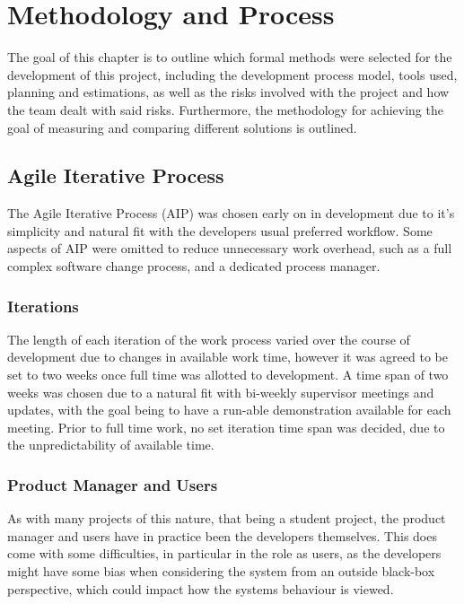 \chapter{Methodology and Process}

The goal of this chapter is to outline which formal methods were selected for the development of this project, including the development process model, tools used, planning and estimations, as well as the risks involved with the project and how the team dealt with said risks. Furthermore, the methodology for achieving the goal of measuring and comparing different solutions is outlined.

\section{Agile Iterative Process}

The Agile Iterative Process\cite{raj13} (AIP) was chosen early on in development due to it's simplicity and natural fit with the developers usual preferred workflow. Some aspects of AIP were omitted to reduce unnecessary work overhead, such as a full complex software change process, and a dedicated process manager.

\subsection{Iterations}

The length of each iteration of the work process varied over the course of development due to changes in available work time, however it was agreed to be set to two weeks once full time was allotted to development. A time span of two weeks was chosen due to a natural fit with bi-weekly supervisor meetings and updates, with the goal being to have a run-able demonstration available for each meeting. Prior to full time work, no set iteration time span was decided, due to the unpredictability of available time.

\subsection{Product Manager and Users}

As with many projects of this nature, that being a student project, the product manager and users have in practice been the developers themselves. This does come with some difficulties, in particular in the role as users, as the developers might have some bias when considering the system from an outside black-box perspective, which could impact how the systems behaviour is viewed.

